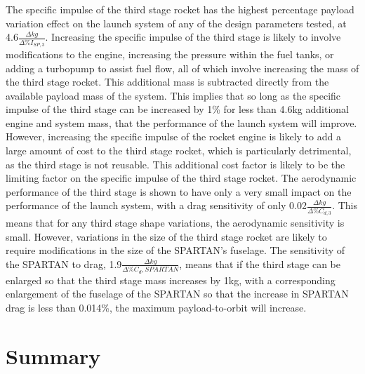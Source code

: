  The specific impulse of the third stage rocket has the highest percentage payload variation effect on the launch system of any of the design parameters tested, at 4.6$\frac{\Delta kg}{\Delta\%I_{SP,3}}$. Increasing the specific impulse of the third stage is likely to involve modifications to the engine, increasing the pressure within the fuel tanks, or adding a turbopump to assist fuel flow, all of which involve increasing the mass of the third stage rocket. 
This additional mass is subtracted directly from the available payload mass of the system. This implies that so long as the specific impulse of the third stage can be increased by 1\% for less than 4.6kg additional engine and system mass, that the performance of the launch system will improve. 
However, increasing the specific impulse of the rocket engine is likely to add a large amount of cost to the third stage rocket, which is particularly detrimental, as the third stage is not reusable. This additional cost factor is likely to be the limiting factor on the specific impulse of the third stage rocket. 
 The aerodynamic performance of the third stage is shown to have only a very small impact on the performance of the launch system, with a drag sensitivity of only 0.02$\frac{\Delta kg}{\Delta\%C_{d,3}}$. This means that for any third stage shape variations, the aerodynamic sensitivity is small.
However, variations in the size of the third stage rocket are likely to require modifications in the size of the SPARTAN's fuselage. The sensitivity of the SPARTAN to drag, 1.9$\frac{\Delta kg}{\Delta\%C_d,{SPARTAN}}$, means that if the third stage can be enlarged so that the third stage mass increases by 1kg, with a corresponding enlargement of the fuselage of the SPARTAN so that the increase in SPARTAN drag is less than 0.014\%, the maximum payload-to-orbit will increase. 








\section{Summary}


